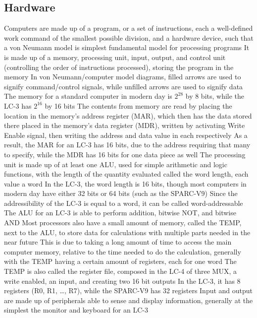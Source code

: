 \documentclass[11 pt, twoside]{article}
\newenvironment{outline*}
{
	\begin{outline}[enumerate]
	}
	{\end{outline}
}
\begin{document}
\subsection{Hardware}
\begin{outline*}
\1 Computers are made up of a program, or a set of instructions, each a well-defined work command of the smallest possible division, and a hardware device, such that a von Neumann model is simplest fundamental model for processing programs
\2 It is made up of a memory, processing unit, input, output, and control unit (controlling the order of instructions processed), storing the program in the memory
\2 In von Neumann/computer model diagrams, filled arrows are used to signify command/control signals, while unfilled arrows are used to signify data
\1 The memory for a standard computer in modern day is $2^{28}$ by 8 bits, while the LC-3 has $2^{16}$ by 16 bits
\2 The contents from memory are read by placing the location in the memory's address register (MAR), which then has the data stored there placed in the memory's data register (MDR), written by activating Write Enable signal, then writing the address and data value in each respectively
\2 As a result, the MAR for an LC-3 has 16 bits, due to the address requiring that many to specify, while the MDR has 16 bits for one data piece as well
\1 The processing unit is made up of at least one ALU, used for simple arithmetic and logic functions, with the length of the quantity evaluated called the word length, each value a word
\2 In the LC-3, the word length is 16 bits, though most computers in modern day have either 32 bits or 64 bits (such as the SPARC-V9)
\3 Since the addressibility of the LC-3 is equal to a word, it can be called word-addressable
\2 The ALU for an LC-3 is able to perform addition, bitwise NOT, and bitwise AND
\2 Most processors also have a small amount of memory, called the TEMP, next to the ALU, to store data for calculations with multiple parts needed in the near future
\3 This is due to taking a long amount of time to access the main computer memory, relative to the time needed to  do the calculation, generally with the TEMP having a certain amount of registers, each for one word
\3 The TEMP is also called the register file, composed in the LC-4 of three MUX, a write enabled, an input, and creating two 16 bit outputs
\3 In the LC-3, it has 8 registers (R0, R1, \dots, R7), while the SPARC-V9 has 32 registers
\1 Input and output are made up of peripherals able to sense and display information, generally at the simplest the monitor and keyboard for an LC-3

\end{outline*}
\end{document}
